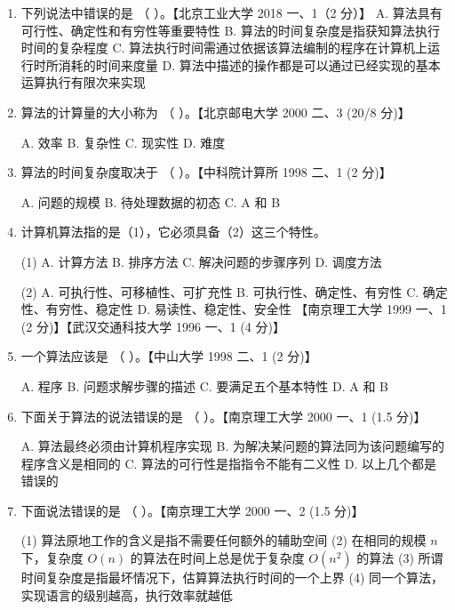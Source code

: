 \documentclass[lang=cn,newtx,10pt,scheme=chinese]{elegantbook}
\begin{document}
\begin{enumerate}
    \item 下列说法中错误的是 （ \quad）。【北京工业大学 2018 一、1（2 分）】  
    A. 算法具有可行性、确定性和有穷性等重要特性  
    B. 算法的时间复杂度是指获知算法执行时间的复杂程度  
    C. 算法执行时间需通过依据该算法编制的程序在计算机上运行时所消耗的时间来度量  
    D. 算法中描述的操作都是可以通过已经实现的基本运算执行有限次来实现  


    \item 算法的计算量的大小称为 （ \quad）。【北京邮电大学 2000 二、3 (20/8 分)】  
    
    A. 效率 \quad B. 复杂性 \quad C. 现实性 \quad D. 难度

    \item 算法的时间复杂度取决于 （ \quad）。【中科院计算所 1998 二、1 (2 分)】  
    
    A. 问题的规模 \quad B. 待处理数据的初态 \quad C. A 和 B

    \item 计算机算法指的是（1），它必须具备（2）这三个特性。  
    
    (1) A. 计算方法 \quad B. 排序方法 \quad C. 解决问题的步骤序列 \quad D. 调度方法  
    
    (2) A. 可执行性、可移植性、可扩充性 \quad B. 可执行性、确定性、有穷性  
    \quad C. 确定性、有穷性、稳定性 \quad D. 易读性、稳定性、安全性  
    【南京理工大学 1999 一、1 (2 分)】【武汉交通科技大学 1996 一、1 (4 分)】

    \item 一个算法应该是 （ \quad）。【中山大学 1998 二、1 (2 分)】  
    
    A. 程序 \quad B. 问题求解步骤的描述 \quad C. 要满足五个基本特性 \quad D. A 和 B

    \item 下面关于算法的说法错误的是 （ \quad）。【南京理工大学 2000 一、1 (1.5 分)】  
    
    A. 算法最终必须由计算机程序实现  
    B. 为解决某问题的算法同为该问题编写的程序含义是相同的  
    C. 算法的可行性是指指令不能有二义性  
    D. 以上几个都是错误的

    \item 下面说法错误的是 （ \quad）。【南京理工大学 2000 一、2 (1.5 分)】  
    
    (1) 算法原地工作的含义是指不需要任何额外的辅助空间  
    (2) 在相同的规模 $n$ 下，复杂度 $O(n)$ 的算法在时间上总是优于复杂度 $O(n^2)$ 的算法  
    (3) 所谓时间复杂度是指最坏情况下，估算算法执行时间的一个上界  
    (4) 同一个算法，实现语言的级别越高，执行效率就越低  
    

\end{enumerate}
\end{document}
